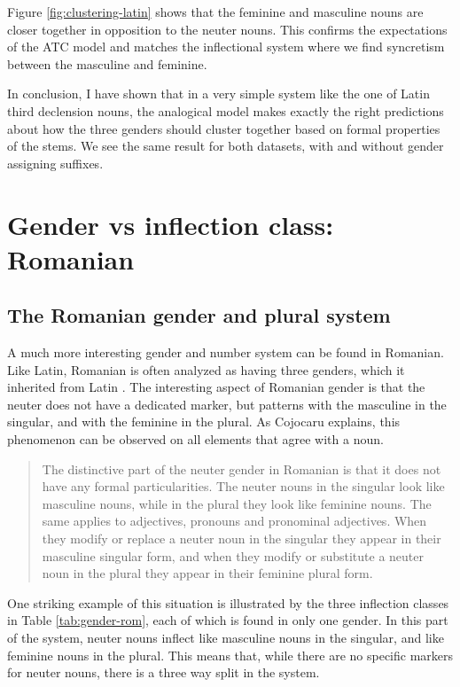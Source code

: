 Figure \ref{fig:clustering-latin} shows that the feminine and masculine nouns are closer together in opposition to the neuter nouns. This confirms the expectations of the ATC model and matches the inflectional system where we find syncretism between the masculine and feminine.

In conclusion, I have shown that in a very simple system like the one of Latin third declension nouns, the analogical model makes exactly the right predictions about how the three genders should cluster together based on formal properties of the stems. We see the same result for both datasets, with and without gender assigning suffixes.


\section{Gender vs inflection class: Romanian}

\subsection{The Romanian gender and plural system}


A much more interesting gender and number system can be found in Romanian. Like Latin, Romanian is often analyzed as having three genders, which it inherited from Latin \autocite[p. 23]{Gonczol.2007}. The interesting aspect of Romanian gender is that the neuter does not have a dedicated marker, but patterns with the masculine in the singular, and with the feminine in the plural. As Cojocaru explains, this phenomenon can be observed on all elements that agree with a noun. 

\begin{quotation}
The distinctive part of the neuter gender in Romanian is that it does not have any formal particularities. The neuter nouns in the singular look like masculine nouns, while in the plural they look like feminine nouns. The same applies to adjectives, pronouns and pronominal adjectives. When they modify or replace a neuter noun in the singular they appear in their masculine singular form, and when they modify or substitute a neuter noun in the plural they appear in their feminine plural form. \autocite[p. 27]{Cojocaru.2003}
\end{quotation}

One striking example of this situation is illustrated by the three inflection classes in Table \ref{tab:gender-rom}, each of which is found in only one gender. In this part of the system, neuter nouns inflect like masculine nouns in the singular, and like feminine nouns in the plural. This means that, while there are no specific markers for neuter nouns, there is a three way split in the system.

